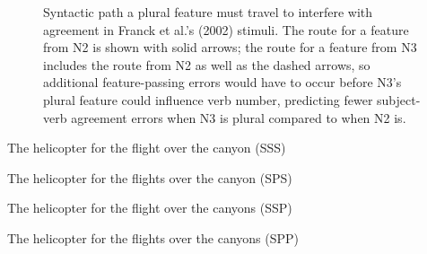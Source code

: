\documentclass[12pt,titlepage]{article}
\newcommand{\insertnote}[1]{%
\vspace{\baselineskip}
\noindent
\begin{minipage}{\textwidth}
\begin{center}
========================= \\
Insert #1 About Here \\
========================= \\
\end{center}
\vspace{.8\baselineskip}
\end{minipage}}
\newcommand{\framefig}[1]{#1}
\newcommand{\figscaleset}{.45}
\begin{document}

\begin{figure}[tb]

    \makebox[\textwidth][c]{\framefig{\texttt{[image: descstruc]}}}

\caption{Syntactic path a plural feature must travel to interfere with
agreement in Franck et al.'s (2002) stimuli.  The route for a feature from
N2 is shown with solid arrows; the route for a feature from N3 includes the
route from N2 as well as the dashed arrows, so additional feature-passing
errors would have to occur before N3's plural feature could influence verb
number, predicting fewer subject-verb agreement errors when N3 is plural
compared to when N2 is.}

\label{descstruc}
\end{figure}

\begin{myexample}
\label{Franck-ex}
\begin{examples}
    
    \item \label{FranckSSS} The helicopter for the flight over the canyon
    \hfill (SSS)\hspace{12em}
    
    \item \label{FranckSPS} The helicopter for the flights over the canyon
    \hfill (SPS)\hspace{12em}
    
    \item \label{FranckSSP}The helicopter for the flight over the canyons
    \hfill (SSP)\hspace{12em}

    \item \label{FranckSPP}The helicopter for the flights over the canyons
    \hfill (SPP)\hspace{12em}
    
\end{examples}
\end{myexample}
\end{document}
